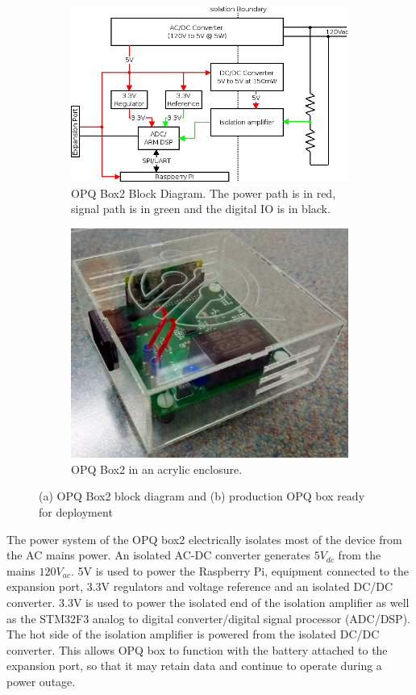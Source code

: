 \begin{figure}[h]
	\centering
	\begin{subfigure}{.5\textwidth}
	  \centering
	  \includegraphics[width=0.9\linewidth]{img/opqbox_diagram.png}
	  \caption{OPQ Box2 Block Diagram. The power path is in red, signal path is in green and the digital IO is in black.}
	  \label{fig2:sub1}
	\end{subfigure}%
	\begin{subfigure}{.5\textwidth}
	  \centering
	  \includegraphics[width=0.7\linewidth]{img/opqbox_photo.jpg}
	  \caption{OPQ Box2 in an acrylic enclosure.}
	  \label{fig2:sub2}
	\end{subfigure}
	\caption{(a) OPQ Box2 block diagram and (b) production OPQ box ready for deployment}
	\label{fig:2}
\end{figure}

The power system of the OPQ box2 electrically isolates most of the device from the AC mains power. An isolated AC-DC converter generates $5V_{dc}$ from the mains $120V_{ac}$. 5V is used to power the Raspberry Pi, equipment connected to the expansion port, 3.3V regulators and voltage reference and an isolated DC/DC converter. 3.3V is used to power the isolated end of the isolation amplifier as well as the STM32F3 analog to digital converter/digital signal processor (ADC/DSP). The hot side of the isolation amplifier is powered from the isolated DC/DC converter. This allows OPQ box to function with the battery attached to the expansion port, so that it may retain data and continue to operate during a power outage. 

